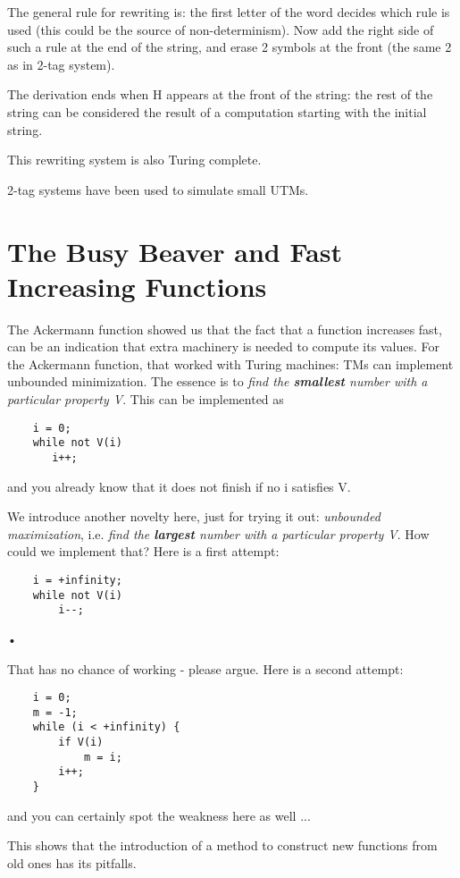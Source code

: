 The general rule for rewriting is: the first letter of the word
decides which rule is used (this could be the source of
non-determinism). Now add the right side of such a rule at the end of
the string, and erase 2 symbols at the front (the same 2 as in 2-tag
system).

The derivation ends when H appears at the front of the string: the
rest of the string can be considered the result of a computation
starting with the initial string.

This rewriting system is also Turing complete.


2-tag systems have been used to simulate small UTMs.




\section{The Busy Beaver and Fast Increasing Functions}

The Ackermann function showed us that the fact that a function
increases fast, can be an indication that extra machinery is needed to
compute its values. For the Ackermann function, that worked with
Turing machines: TMs can implement unbounded minimization. The essence
is to {\em find the {\bf smallest} number with a particular property
  V}. This can be implemented as
\begin{verbatim}
    i = 0;
    while not V(i)
       i++;
\end{verbatim}
and you already know that it does not finish if no i satisfies V.

We introduce another novelty here, just for trying it out: {\em
  unbounded maximization}, i.e. {\em find the {\bf largest} number
  with a particular property V}. How could we implement that? Here is
a first attempt:

\begin{verbatim}
    i = +infinity;
    while not V(i)
        i--;
\end{verbatim}•

That has no chance of working - please argue. Here is a second attempt:
\begin{verbatim}
    i = 0;
    m = -1;
    while (i < +infinity) {
        if V(i)
            m = i;
        i++;
    }
\end{verbatim}
and you can certainly spot the weakness here as well ...

This shows that the introduction of a method to construct new
functions from old ones has its pitfalls.


